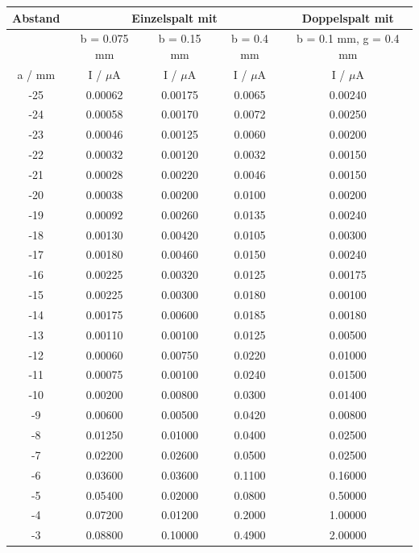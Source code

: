 \begin{table}[H] %
  \small
  \centering
  \begin{tabular}{c || c | c | c | c}
    \toprule
    Abstand & \multicolumn{3}{|c|}{Einzelspalt mit} & Doppelspalt mit \\
    \toprule
    & b = 0.075 mm & b = 0.15 mm & b = 0.4 mm & b = 0.1 mm, g = 0.4 mm \\
    a / mm & I /  $\mu$A & I / $\mu$A & I / $\mu$A & I / $\mu$A \\
    \midrule
    -25	& 0.00062 & 0.00175 & 0.0065 & 0.00240 \\
    -24	& 0.00058 & 0.00170 & 0.0072 & 0.00250 \\
    -23	& 0.00046 & 0.00125 & 0.0060 & 0.00200 \\
    -22	& 0.00032 & 0.00120 & 0.0032 & 0.00150 \\
    -21	& 0.00028 & 0.00220 & 0.0046 & 0.00150 \\
    -20	& 0.00038 & 0.00200 & 0.0100 & 0.00200 \\
    -19	& 0.00092 & 0.00260 & 0.0135 & 0.00240 \\
    -18	& 0.00130 & 0.00420 & 0.0105 & 0.00300 \\
    -17	& 0.00180 & 0.00460 & 0.0150 & 0.00240 \\
    -16	& 0.00225 & 0.00320 & 0.0125 & 0.00175 \\
    -15	& 0.00225 & 0.00300 & 0.0180 & 0.00100 \\
    -14	& 0.00175 & 0.00600 & 0.0185 & 0.00180 \\
    -13	& 0.00110 & 0.00100 & 0.0125 & 0.00500 \\
    -12	& 0.00060 & 0.00750 & 0.0220 & 0.01000 \\
    -11	& 0.00075 & 0.00100 & 0.0240 & 0.01500 \\
    -10	& 0.00200 & 0.00800 & 0.0300 & 0.01400 \\
    -9	& 0.00600 & 0.00500 & 0.0420 & 0.00800 \\
    -8	& 0.01250 & 0.01000 & 0.0400 & 0.02500 \\
    -7	& 0.02200 & 0.02600 & 0.0500 & 0.02500 \\
    -6	& 0.03600 & 0.03600 & 0.1100 & 0.16000 \\
    -5	& 0.05400 & 0.02000 & 0.0800 & 0.50000 \\
    -4	& 0.07200 & 0.01200 & 0.2000 & 1.00000 \\
    -3	& 0.08800 & 0.10000 & 0.4900 & 2.00000 \\

\end{tabular}
\end{table}
